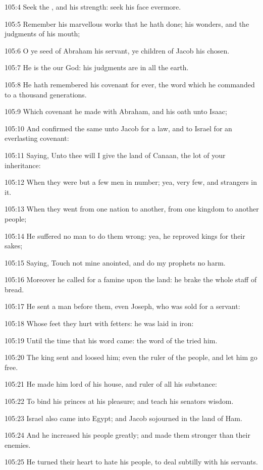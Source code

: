 105:4 Seek the \LORD, and his strength: seek his face evermore.

105:5 Remember his marvellous works that he hath done; his wonders, and the judgments of his mouth;

105:6 O ye seed of Abraham his servant, ye children of Jacob his chosen.

105:7 He is the \LORD our God: his judgments are in all the earth.

105:8 He hath remembered his covenant for ever, the word which he commanded to a thousand generations.

105:9 Which covenant he made with Abraham, and his oath unto Isaac;

105:10 And confirmed the same unto Jacob for a law, and to Israel for an everlasting covenant:

105:11 Saying, Unto thee will I give the land of Canaan, the lot of your inheritance:

105:12 When they were but a few men in number; yea, very few, and strangers in it.

105:13 When they went from one nation to another, from one kingdom to another people;

105:14 He suffered no man to do them wrong: yea, he reproved kings for their sakes;

105:15 Saying, Touch not mine anointed, and do my prophets no harm.

105:16 Moreover he called for a famine upon the land: he brake the whole staff of bread.

105:17 He sent a man before them, even Joseph, who was sold for a servant:

105:18 Whose feet they hurt with fetters: he was laid in iron:

105:19 Until the time that his word came: the word of the \LORD tried him.

105:20 The king sent and loosed him; even the ruler of the people, and let him go free.

105:21 He made him lord of his house, and ruler of all his substance:

105:22 To bind his princes at his pleasure; and teach his senators wisdom.

105:23 Israel also came into Egypt; and Jacob sojourned in the land of Ham.

105:24 And he increased his people greatly; and made them stronger than their enemies.

105:25 He turned their heart to hate his people, to deal subtilly with his servants.

